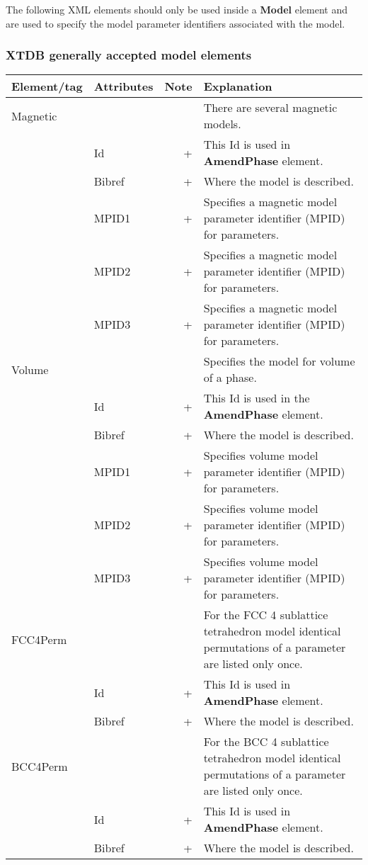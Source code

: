 \documentclass{article}
\begin{document}
The following XML elements should only be used inside a {\bf Model} element
and are used to specify the model parameter identifiers associated with the
model.

\subsubsection{XTDB generally accepted model elements}

\bigskip
\begin{tabular}{|p{} p{} r p{}|}\hline
  Element/tag & Attributes & Note & Explanation\\\hline


  Magnetic & && There are several magnetic models.\\
      & Id & + & This Id is used in {\bf AmendPhase} element.\\
      & Bibref & + & Where the model is described.\\
      & MPID1 & + & Specifies a magnetic model parameter identifier (MPID) for parameters.\\
      & MPID2 & + & Specifies a magnetic model parameter identifier (MPID) for parameters.\\
      & MPID3 & + & Specifies a magnetic model parameter identifier (MPID) for parameters.\\\hline

  Volume & && Specifies the model for volume of a phase.\\
      & Id & + & This Id is used in the {\bf AmendPhase} element.\\
      & Bibref & + & Where the model is described.\\
      & MPID1 & + & Specifies volume model parameter identifier (MPID) for parameters.\\
      & MPID2 & + & Specifies volume model parameter identifier (MPID) for parameters.\\
      & MPID3 & + & Specifies volume model parameter identifier (MPID) for parameters.\\\hline

  FCC4Perm & & & For the FCC 4 sublattice tetrahedron model identical permutations of a parameter are listed only once.\\
     & Id & + & This Id is used in {\bf AmendPhase} element.\\
     & Bibref & + & Where the model is described.\\\hline

  BCC4Perm & & & For the BCC 4 sublattice tetrahedron model identical permutations of a parameter are listed only once.\\
     & Id & + & This Id is used in {\bf AmendPhase} element.\\
     & Bibref & + & Where the model is described.\\\hline

\end{tabular}
\end{document}
